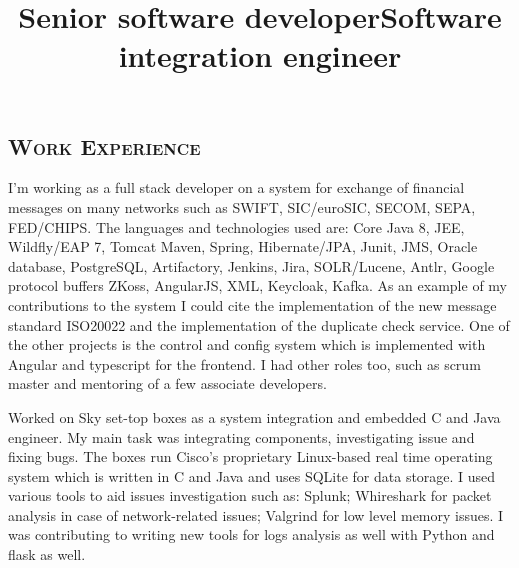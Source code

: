 \begin{resume}
        \section{\textsc{Work Experience}}
        \title{Senior software developer}
        \begin{position}
            I'm working as a full stack developer on a system for exchange of financial messages on many networks such as SWIFT, SIC/euroSIC, SECOM, SEPA, FED/CHIPS.
            The languages and technologies used are: %
            Core Java 8, JEE, 
            Wildfly/EAP 7, Tomcat
            Maven, Spring, Hibernate/JPA, 
            Junit,
            JMS,
            Oracle database, PostgreSQL,
            Artifactory,
            Jenkins,
            Jira,
            SOLR/Lucene,
            Antlr,
            Google protocol buffers
            ZKoss,
            AngularJS,
            XML,
            Keycloak,
            Kafka.
            As an example of my contributions to the system I could cite the implementation of the new message standard ISO20022 and the implementation of the duplicate check service.
            One of the other projects is the control and config system which is implemented with Angular and typescript for the frontend.
            I had other roles too, such as scrum master and mentoring of a few associate developers.
        \end{position}
        \title{Software integration engineer}
        \begin{position}
            Worked on Sky set-top boxes as a system integration and embedded C and Java engineer.
            My main task was integrating components, investigating issue and fixing bugs.
            The boxes run Cisco's proprietary Linux-based real time operating system which is written in C and Java
            and uses SQLite for data storage.
            I used various tools to aid issues investigation such as: Splunk;
            Whireshark for packet analysis in case of network-related issues;
            Valgrind for low level memory issues.
            I was contributing to writing new tools for logs analysis as well with Python and flask as well.
        \end{position}

\end{resume}
